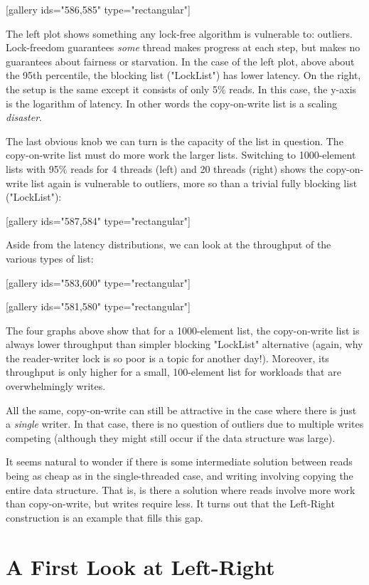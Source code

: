 \documentclass[11pt]{article}
\begin{document}
[gallery ids="586,585" type="rectangular"]

The left plot shows something any lock-free algorithm is vulnerable to: outliers. Lock-freedom guarantees \emph{some} thread makes progress at each step, but makes no guarantees about fairness or starvation. In the case of the left plot, above about the 95th percentile, the blocking list ("LockList") has  lower latency. On the right, the setup is the same except it consists of only 5\% reads. In this case, the y-axis is the logarithm of latency. In other words the copy-on-write list is a scaling \emph{disaster}.

The last obvious knob we can turn is the capacity of the list in question. The copy-on-write list must do more work the larger lists. Switching to 1000-element lists with 95\% reads for 4 threads (left) and 20 threads (right) shows the copy-on-write list again is vulnerable to outliers, more so than a trivial fully blocking list ("LockList"):

[gallery ids="587,584" type="rectangular"]

Aside from the latency distributions, we can look at the throughput of the various types of list:

[gallery ids="583,600" type="rectangular"]

[gallery ids="581,580" type="rectangular"]

The four graphs above show that for a 1000-element list, the copy-on-write list is always lower throughput than simpler blocking "LockList" alternative (again, why the reader-writer lock is so poor is a topic for another day!). Moreover, its throughput is only higher for a small, 100-element list for workloads that are overwhelmingly writes.

All the same, copy-on-write can still be attractive in the case where there is just a \emph{single} writer. In that case, there is no question of outliers due to multiple writes competing (although they might still occur if the data structure was large).

It seems natural to wonder if there is some intermediate solution between reads being as cheap as in the single-threaded case, and writing involving copying the entire data structure. That is, is there a solution where reads involve more work than copy-on-write, but writes require less. It turns out that the Left-Right construction is an example that fills this gap.

\section{A First Look at Left-Right}
\end{document}
